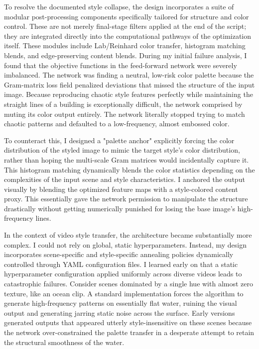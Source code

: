 \documentclass[12pt,letterpaper]{article}
\begin{document}
To resolve the documented style collapse, the design incorporates a suite of modular post-processing components specifically tailored for structure and color control. These are not merely final-stage filters applied at the end of the script; they are integrated directly into the computational pathways of the optimization itself. These modules include Lab/Reinhard color transfer, histogram matching blends, and edge-preserving content blends. During my initial failure analysis, I found that the objective functions in the feed-forward network were severely imbalanced. The network was finding a neutral, low-risk color palette because the Gram-matrix loss field penalized deviations that missed the structure of the input image. Because reproducing chaotic style features perfectly while maintaining the straight lines of a building is exceptionally difficult, the network comprised by muting its color output entirely. The network literally stopped trying to match chaotic patterns and defaulted to a low-frequency, almost embossed color.

To counteract this, I designed a "palette anchor" explicitly forcing the color distribution of the styled image to mimic the target style's color distribution, rather than hoping the multi-scale Gram matrices would incidentally capture it. This histogram matching dynamically blends the color statistics depending on the complexities of the input scene and style characteristics. I anchored the output visually by blending the optimized feature maps with a style-colored content proxy. This essentially gave the network permission to manipulate the structure drastically without getting numerically punished for losing the base image's high-frequency lines.

In the context of video style transfer, the architecture became substantially more complex. I could not rely on global, static hyperparameters. Instead, my design incorporates scene-specific and style-specific annealing policies dynamically controlled through YAML configuration files. I learned early on that a static hyperparameter configuration applied uniformly across diverse videos leads to catastrophic failures. Consider scenes dominated by a single hue with almost zero texture, like an ocean clip. A standard implementation forces the algorithm to generate high-frequency patterns on essentially flat water, ruining the visual output and generating jarring static noise across the surface. Early versions generated outputs that appeared utterly style-insensitive on these scenes because the network over-constrained the palette transfer in a desperate attempt to retain the structural smoothness of the water.
\end{document}
